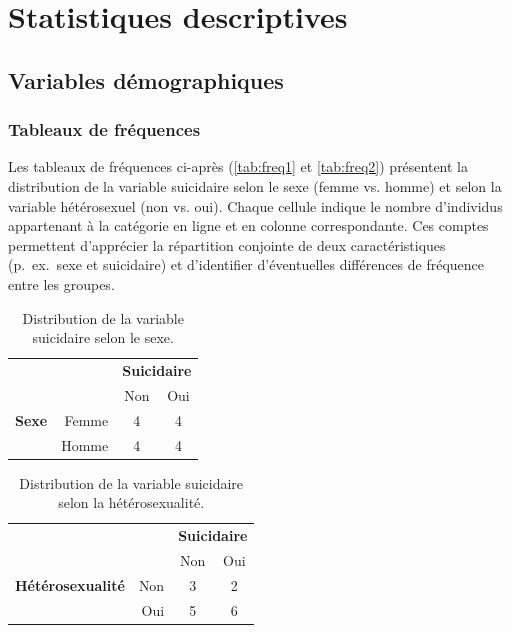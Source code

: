 \section{Statistiques descriptives}

\subsection{Variables démographiques}

\subsubsection*{Tableaux de fréquences}
Les tableaux de fréquences ci-après (\autoref{tab:freq1} et \autoref{tab:freq2}) présentent la distribution de la variable suicidaire selon le sexe (femme vs. homme) et selon la variable hétérosexuel (non vs. oui). Chaque cellule indique le nombre d’individus appartenant à la catégorie en ligne et en colonne correspondante. Ces comptes permettent d’apprécier la répartition conjointe de deux caractéristiques (p.~ex.~sexe et suicidaire) et d’identifier d’éventuelles différences de fréquence entre les groupes.

\begin{table}[H]
	\centering
	\caption{Distribution de la variable suicidaire selon le sexe.}
	\label{tab:freq1}
	\begin{tabular}{|rr|cc|}
		\toprule
		   & & \multicolumn{2}{c|}{\textbf{Suicidaire}} \\
		  & & Non & Oui \\
		\midrule
	\textbf{Sexe}	& Femme & 4 & 4 \\
					& Homme & 4 & 4 \\
		\bottomrule
	\end{tabular}
\end{table}

\begin{table}[H]
	\centering
	\caption{Distribution de la variable suicidaire selon la hétérosexualité.}
	\label{tab:freq2}
	\begin{tabular}{|rr|cc|}
		\toprule
		& & \multicolumn{2}{c|}{\textbf{Suicidaire}} \\
		& & Non & Oui\\
		\midrule
\textbf{Hétérosexualité} & Non & 3 & 2 \\
		& Oui & 5 & 6 \\
		\bottomrule
	\end{tabular}
\end{table}


